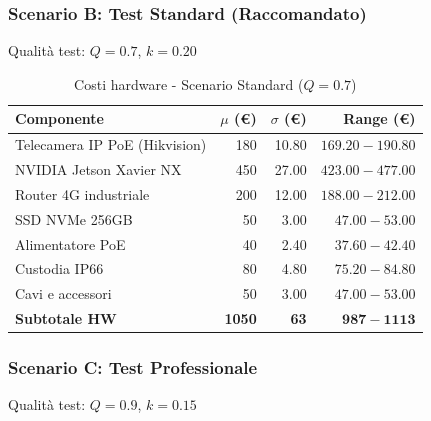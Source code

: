 \documentclass[a4paper,11pt]{article}
\begin{document}
\subsubsection{Scenario B: Test Standard (Raccomandato)}

Qualità test: $Q = 0.7$, $k = 0.20$

\begin{table}[H]
    \centering
    \begin{tabular}{lrrr}
        \toprule
        \textbf{Componente} & \textbf{$\mu$ (€)} & \textbf{$\sigma$ (€)} & \textbf{Range (€)} \\
        \midrule
        Telecamera IP PoE (Hikvision) & 180 & 10.80 & $169.20 - 190.80$ \\
        NVIDIA Jetson Xavier NX & 450 & 27.00 & $423.00 - 477.00$ \\
        Router 4G industriale & 200 & 12.00 & $188.00 - 212.00$ \\
        SSD NVMe 256GB & 50 & 3.00 & $47.00 - 53.00$ \\
        Alimentatore PoE & 40 & 2.40 & $37.60 - 42.40$ \\
        Custodia IP66 & 80 & 4.80 & $75.20 - 84.80$ \\
        Cavi e accessori & 50 & 3.00 & $47.00 - 53.00$ \\
        \midrule
        \textbf{Subtotale HW} & \textbf{1050} & \textbf{63} & $\mathbf{987 - 1113}$ \\
        \bottomrule
    \end{tabular}
    \caption{Costi hardware - Scenario Standard ($Q = 0.7$)}
\end{table}

\subsubsection{Scenario C: Test Professionale}

Qualità test: $Q = 0.9$, $k = 0.15$
\end{document}

